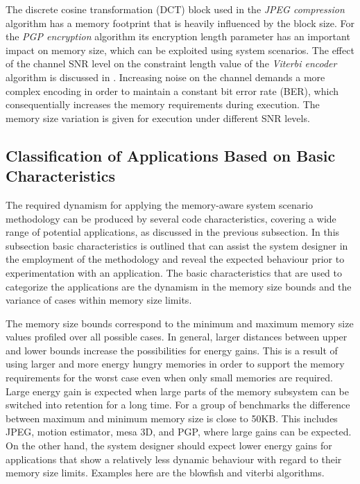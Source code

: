 \documentclass[a4paper,conference]{IEEEtran}
\begin{document}
The discrete cosine transformation (DCT) block used in the \textit{JPEG compression} algorithm has a memory footprint that is heavily influenced by the block size. For the \textit{PGP encryption} algorithm its encryption length parameter has an important impact on memory size, which can be exploited using system scenarios. The effect of the channel SNR level on the constraint length value of the \textit{Viterbi encoder} algorithm is discussed in \cite{Fil12}. Increasing noise on the channel demands a more complex encoding in order to maintain a constant bit error rate (BER), which consequentially increases the memory requirements during execution. The memory size variation is given for execution under different SNR levels.  

\subsection{Classification of Applications Based on Basic Characteristics}
\label{sec:categorisation}
The required dynamism for applying the memory-aware system scenario methodology can be produced by several code characteristics, covering a wide range of potential applications, as discussed in the previous subsection. In this subsection basic characteristics is outlined that can assist the system designer in the employment of the methodology and reveal the expected behaviour prior to experimentation with an application. The basic characteristics that are used to categorize the applications are the dynamism in the memory size bounds and the variance of cases within memory size limits.

The memory size bounds correspond to the minimum and maximum memory size values profiled over all possible cases. In general, larger distances between upper and lower bounds increase the possibilities for energy gains. This is a result of using larger and more energy hungry memories in order to support the memory requirements for the worst case even when only small memories are required. Large energy gain is expected when large parts of the memory subsystem can be switched into retention for a long time. For a group of benchmarks the difference between maximum and minimum memory size is close to 50KB. This includes JPEG, motion estimator, mesa 3D, and PGP, where large gains can be expected. On the other hand, the system designer should expect lower energy gains for applications that show a relatively less dynamic behaviour with regard to their memory size limits. Examples here are the blowfish and viterbi algorithms. 
\end{document}
